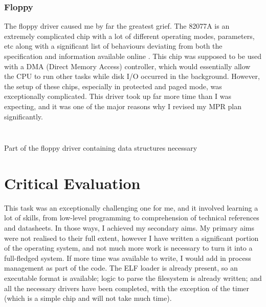 \documentclass[a4paper,12pt]{article}
\begin{document}
\subsubsection{Floppy}
The floppy driver caused me by far the greatest grief. The 82077A is an extremely complicated chip with a lot of different operating modes, parameters, etc along with a significant list of behaviours deviating from both the specification and information available online \citep{82077a_reference}. This chip was supposed to be used with a DMA (Direct Memory Access) controller, which would essentially allow the CPU to run other tasks while disk I/O occurred in the background. However, the setup of these chips, especially in protected and paged mode, was exceptionally complicated. This driver took up far more time than I was expecting, and it was one of the major reasons why I revised my MPR plan significantly.

\begin{listing}[H]
\ifwindows
\inputminted[breaklines, linenos, numbersep=5pt, firstline=39, lastline=50]{c}{/home/vedantg/os/kernel/hw/i82077a/i82077a.c} %
\else
\inputminted[breaklines, linenos, numbersep=5pt, firstline=39, lastline=50]{c}{/home/vedantg/os/kernel/hw/i82077a/i82077a.c} %
\fi
\caption{Part of the floppy driver containing data structures necessary}
\label{listing:floppy}
\end{listing}



\section{Critical Evaluation}

This task was an exceptionally challenging one for me, and it involved learning a lot of skills, from low-level programming to comprehension of technical references and datasheets. In those ways, I achieved my secondary aims.
My primary aims were not realised to their full extent, however I have written a significant portion of the operating system, and not much more work is necessary to turn it into a full-fledged system. If more time was available to write, I would add in process management as part of the code. The ELF loader is already present, so an executable format is available; logic to parse the filesystem is already written; and all the necessary drivers have been completed, with the exception of the timer (which is a simple chip and will not take much time). 

\end{document}
